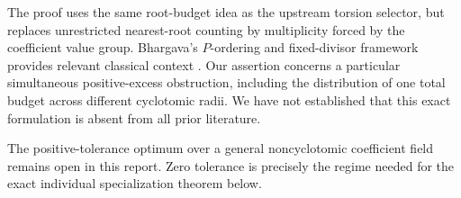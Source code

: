 The proof uses the same root-budget idea as the upstream torsion selector, but replaces unrestricted nearest-root counting by multiplicity forced by the coefficient value group. Bhargava's $P$-ordering and fixed-divisor framework provides relevant classical context \cite{bhargava,fixdiv}. Our assertion concerns a particular simultaneous positive-excess obstruction, including the distribution of one total budget across different cyclotomic radii. We have not established that this exact formulation is absent from all prior literature.

The positive-tolerance optimum over a general noncyclotomic coefficient field remains open in this report. Zero tolerance is precisely the regime needed for the exact individual specialization theorem below.


